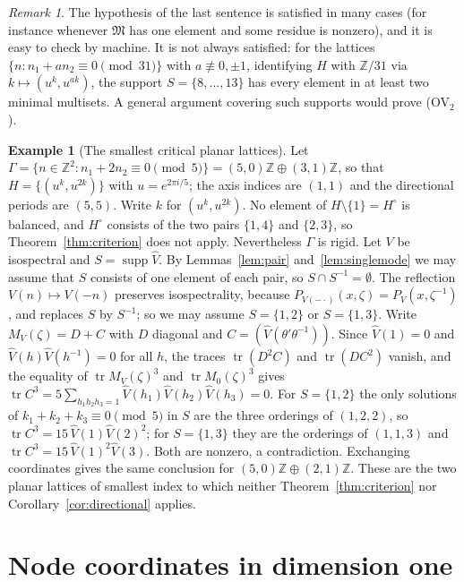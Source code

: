 \documentclass[11pt,reqno]{amsart}
\theoremstyle{definition}
\newtheorem{example}[theorem]{Example}
\theoremstyle{remark}
\newtheorem{remark}[theorem]{Remark}
\newcommand{\Z}{\mathbb Z}
\DeclareMathOperator{\supp}{supp}
\DeclareMathOperator{\tr}{tr}
\begin{document}
\begin{remark}
The hypothesis of the last sentence is satisfied in many cases (for instance
whenever $\mathfrak M$ has one element and some residue is nonzero), and it is
easy to check by machine.  It is not always satisfied: for the lattices
$\{n:n_1+an_2\equiv0\pmod{31}\}$ with $a\not\equiv0,\pm1$, identifying $H$ with
$\Z/31$ via $k\mapsto(u^k,u^{ak})$, the support $S=\{8,\dots,13\}$ has every
element in at least two minimal multisets.  A general argument covering such
supports would prove (OV$_2$).
\end{remark}

\begin{example}[The smallest critical planar lattices]\label{ex:N5}
Let $\Gamma=\{n\in\Z^2:n_1+2n_2\equiv0\pmod5\}=(5,0)\Z\oplus(3,1)\Z$, so that
$H=\{(u^k,u^{2k})\}$ with $u=e^{2\pi i/5}$; the axis indices are $(1,1)$ and the
directional periods are $(5,5)$.  Write $k$ for $(u^k,u^{2k})$.  No element of
$H\setminus\{1\}=H^\circ$ is balanced, and $H^\circ$ consists of the two pairs
$\{1,4\}$ and $\{2,3\}$, so Theorem~\ref{thm:criterion} does not apply.
Nevertheless $\Gamma$ is rigid.  Let $V$ be isospectral and $S=\supp\widehat V$.
By Lemmas~\ref{lem:pair} and~\ref{lem:singlemode} we may assume that $S$
consists of one element of each pair, so $S\cap S^{-1}=\emptyset$.  The
reflection $V(n)\mapsto V(-n)$ preserves isospectrality, because
$P_{V(-\cdot)}(x,\zeta)=P_V(x,\zeta^{-1})$, and replaces $S$ by $S^{-1}$; so we
may assume $S=\{1,2\}$ or $S=\{1,3\}$.  Write $M_V(\zeta)=D+C$ with $D$ diagonal
and $C=(\widehat V(\theta'\theta^{-1}))$.  Since $\widehat V(1)=0$ and
$\widehat V(h)\widehat V(h^{-1})=0$ for all $h$, the traces $\tr(D^2C)$ and
$\tr(DC^2)$ vanish, and the equality of $\tr M_V(\zeta)^3$ and
$\tr M_0(\zeta)^3$ gives
$\tr C^3=5\sum_{h_1h_2h_3=1}\widehat V(h_1)\widehat V(h_2)\widehat V(h_3)=0$.
For $S=\{1,2\}$ the only solutions of $k_1+k_2+k_3\equiv0\pmod5$ in $S$ are the
three orderings of $(1,2,2)$, so $\tr C^3=15\,\widehat V(1)\widehat V(2)^2$; for
$S=\{1,3\}$ they are the orderings of $(1,1,3)$ and
$\tr C^3=15\,\widehat V(1)^2\widehat V(3)$.  Both are nonzero, a contradiction.
Exchanging coordinates gives the same conclusion for $(5,0)\Z\oplus(2,1)\Z$.
These are the two planar lattices of smallest index to which neither
Theorem~\ref{thm:criterion} nor Corollary~\ref{cor:directional} applies.
\end{example}

\section{Node coordinates in dimension one}\label{sec:nodes}
\end{document}
